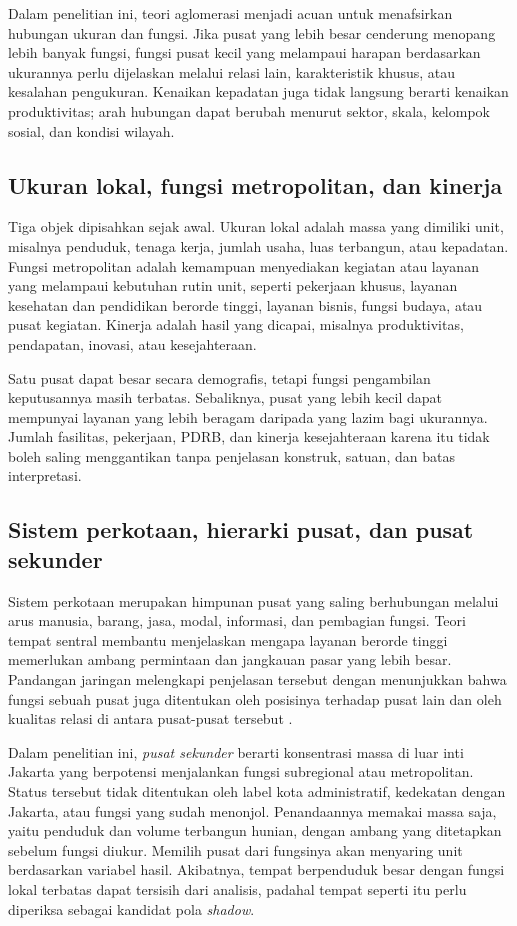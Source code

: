 \documentclass[12pt,a4paper,oneside,openany,indonesian]{report}
\begin{document}
Dalam penelitian ini, teori aglomerasi menjadi acuan untuk menafsirkan hubungan ukuran dan fungsi. Jika pusat yang lebih besar cenderung menopang lebih banyak fungsi, fungsi pusat kecil yang melampaui harapan berdasarkan ukurannya perlu dijelaskan melalui relasi lain, karakteristik khusus, atau kesalahan pengukuran. Kenaikan kepadatan juga tidak langsung berarti kenaikan produktivitas; arah hubungan dapat berubah menurut sektor, skala, kelompok sosial, dan kondisi wilayah.

\subsection{Ukuran lokal, fungsi metropolitan, dan kinerja}

Tiga objek dipisahkan sejak awal. Ukuran lokal adalah massa yang dimiliki unit, misalnya penduduk, tenaga kerja, jumlah usaha, luas terbangun, atau kepadatan. Fungsi metropolitan adalah kemampuan menyediakan kegiatan atau layanan yang melampaui kebutuhan rutin unit, seperti pekerjaan khusus, layanan kesehatan dan pendidikan berorde tinggi, layanan bisnis, fungsi budaya, atau pusat kegiatan. Kinerja adalah hasil yang dicapai, misalnya produktivitas, pendapatan, inovasi, atau kesejahteraan.

Satu pusat dapat besar secara demografis, tetapi fungsi pengambilan keputusannya masih terbatas. Sebaliknya, pusat yang lebih kecil dapat mempunyai layanan yang lebih beragam daripada yang lazim bagi ukurannya. Jumlah fasilitas, pekerjaan, PDRB, dan kinerja kesejahteraan karena itu tidak boleh saling menggantikan tanpa penjelasan konstruk, satuan, dan batas interpretasi.

\subsection{Sistem perkotaan, hierarki pusat, dan pusat sekunder}

Sistem perkotaan merupakan himpunan pusat yang saling berhubungan melalui arus manusia, barang, jasa, modal, informasi, dan pembagian fungsi. Teori tempat sentral membantu menjelaskan mengapa layanan berorde tinggi memerlukan ambang permintaan dan jangkauan pasar yang lebih besar. Pandangan jaringan melengkapi penjelasan tersebut dengan menunjukkan bahwa fungsi sebuah pusat juga ditentukan oleh posisinya terhadap pusat lain dan oleh kualitas relasi di antara pusat-pusat tersebut \parencite{burgermeijers2016}.

Dalam penelitian ini, \textit{pusat sekunder} berarti konsentrasi massa di luar inti Jakarta yang berpotensi menjalankan fungsi subregional atau metropolitan. Status tersebut tidak ditentukan oleh label kota administratif, kedekatan dengan Jakarta, atau fungsi yang sudah menonjol. Penandaannya memakai massa saja, yaitu penduduk dan volume terbangun hunian, dengan ambang yang ditetapkan sebelum fungsi diukur. Memilih pusat dari fungsinya akan menyaring unit berdasarkan variabel hasil. Akibatnya, tempat berpenduduk besar dengan fungsi lokal terbatas dapat tersisih dari analisis, padahal tempat seperti itu perlu diperiksa sebagai kandidat pola \textit{shadow}.
\end{document}
